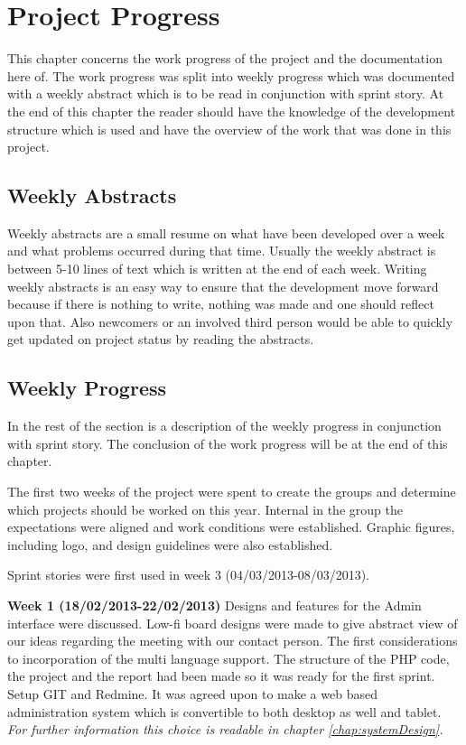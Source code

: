\chapter{Project Progress}
\label{sec:projectProgress}
This chapter concerns the work progress of the project and the documentation here of. The work progress was split into weekly progress which was documented with a weekly abstract which is to be read in conjunction with sprint story. At the end of this chapter the reader should have the knowledge of the development structure which is used and have the overview of the work that was done in this project. 


\section{Weekly Abstracts}      
\label{subsec:weeklyAbstracts}
Weekly abstracts are a small resume on what have been developed over a week and what problems occurred during that time. Usually the weekly abstract is between 5-10 lines of text which is written at the end of each week. Writing weekly abstracts is an easy way to ensure that the development move forward because if there is nothing to write, nothing was made and one should reflect upon that. Also newcomers or an involved third person would be able to quickly get updated on project status by reading the abstracts.         

\section{Weekly Progress}
\label{subsec:weeklyProgress}
In the rest of the section is a description of the weekly progress in conjunction with sprint story.
The conclusion of the work progress will be at the end of this chapter. 

The first two weeks of the project were spent to create the groups and determine which projects should be worked on this year.  
Internal in the group the expectations were aligned and work conditions were established.
Graphic figures, including logo, and design guidelines were also established.      

Sprint stories were first used in week 3 (04/03/2013-08/03/2013).   

\textbf{Week 1 (18/02/2013-22/02/2013)} 
Designs and features for the Admin interface were discussed.
Low-fi board designs were made to give abstract view of our ideas regarding the meeting with our contact person.   
The first considerations to incorporation of the multi language support.
The structure of the PHP code, the project and the report had been made so it was ready for the first sprint.
Setup GIT and Redmine.
It was agreed upon to make a web based administration system which is convertible to both desktop as well and  tablet.  
\textit{For further information this choice is readable in chapter \vref{chap:systemDesign}.}

